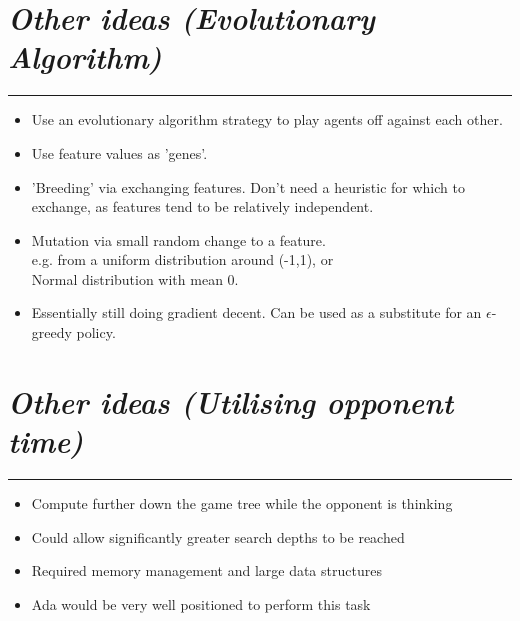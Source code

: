 \documentclass[10pt]{report}
\begin{document}
\begin{multicols}{2}
\section*{\emph{Other ideas (Evolutionary Algorithm)}}
\hrule
    \begin{itemize}
  \item
   	Use an evolutionary algorithm strategy to play agents off against each other.
  \item
	Use feature values as 'genes'.
  \item
	'Breeding' via exchanging features. Don't need a heuristic for which to exchange, as features tend to be relatively independent.
  \item
	Mutation via small random change to a feature.
	\\ e.g. from a uniform distribution around (-1,1), or
	\\ Normal distribution with mean 0.
  \item
	Essentially still doing gradient decent. Can be used as a substitute for an $\epsilon$-greedy policy.
  \end{itemize}

\section*{\emph{Other ideas (Utilising opponent time)}}
\hrule
    \begin{itemize}
  \item
   	Compute further down the game tree while the opponent is thinking
  \item
	Could allow significantly greater search depths to be reached
  \item
	Required memory management and large data structures
  \item
	Ada would be very well positioned to perform this task
  \end{itemize}

\end{multicols}
\end{document}
